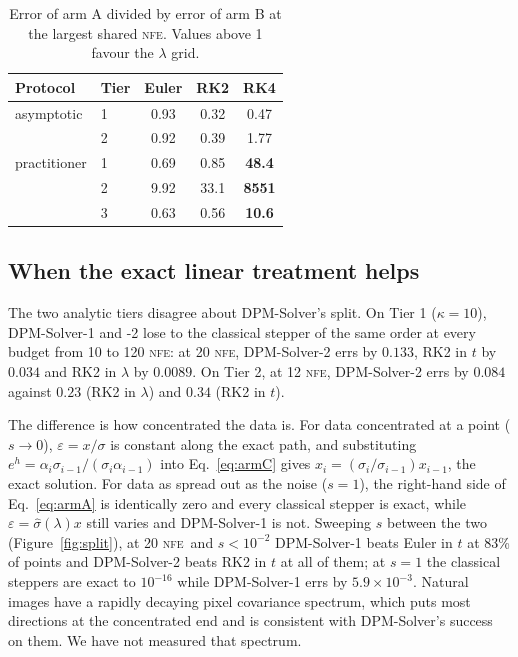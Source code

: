 \documentclass[sigconf]{acmart}
\newcommand{\NFE}{\textsc{nfe}}
\newcommand{\eps}{\varepsilon}
\newcommand{\lam}{\lambda}
\begin{document}
\begin{table}[t]
\caption{Error of arm A divided by error of arm B at the largest shared \NFE.
Values above 1 favour the $\lam$ grid.}
\label{tab:reparam}
\small
\begin{tabular}{@{}llccc@{}}
\toprule
Protocol & Tier & Euler & RK2 & RK4 \\
\midrule
asymptotic   & 1 & 0.93 & 0.32 & 0.47 \\
             & 2 & 0.92 & 0.39 & 1.77 \\
\midrule
practitioner & 1 & 0.69 & 0.85 & \textbf{48.4} \\
             & 2 & 9.92 & 33.1 & \textbf{8551} \\
             & 3 & 0.63 & 0.56 & \textbf{10.6} \\
\bottomrule
\end{tabular}
\end{table}

\subsection{When the exact linear treatment helps}
\label{sec:split}

The two analytic tiers disagree about DPM-Solver's split. On Tier 1 ($\kappa=10$),
DPM-Solver-1 and -2 lose to the classical stepper of the same order at every budget
from 10 to 120 \NFE: at 20 \NFE, DPM-Solver-2 errs by $0.133$, RK2 in $t$ by $0.034$
and RK2 in $\lam$ by $0.0089$. On Tier 2, at 12 \NFE, DPM-Solver-2 errs by $0.084$
against $0.23$ (RK2 in $\lam$) and $0.34$ (RK2 in $t$).

The difference is how concentrated the data is. For data concentrated at a point
($s\to0$), $\eps=x/\sigma$ is constant along the exact path, and substituting
$e^{h}=\alpha_i\sigma_{i-1}/(\sigma_i\alpha_{i-1})$ into Eq.~\eqref{eq:armC} gives
$x_i=(\sigma_i/\sigma_{i-1})x_{i-1}$, the exact solution. For data as spread out as
the noise ($s=1$), the right-hand side of Eq.~\eqref{eq:armA} is identically zero and
every classical stepper is exact, while $\eps=\hat\sigma(\lam)x$ still varies and
DPM-Solver-1 is not. Sweeping $s$ between the two (Figure~\ref{fig:split}), at 20
\NFE\ and $s<10^{-2}$ DPM-Solver-1 beats Euler in $t$ at 83\% of points and
DPM-Solver-2 beats RK2 in $t$ at all of them; at $s=1$ the classical steppers are
exact to $10^{-16}$ while DPM-Solver-1 errs by $5.9\times10^{-3}$. Natural images
have a rapidly decaying pixel covariance spectrum, which puts most directions at
the concentrated end and is consistent with DPM-Solver's success on them. We have
not measured that spectrum.
\end{document}
